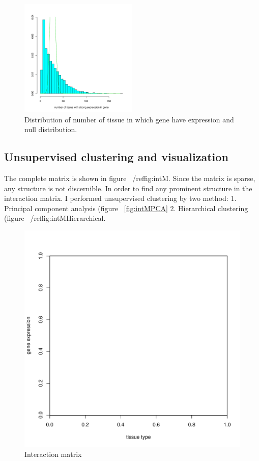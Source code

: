 \documentclass{article}
\begin{document}
\begin{figure}[ht]
	\begin{center}
		\includegraphics[width=0.5\textwidth]{weakExpressed.pdf}
	\end{center}
	\caption{ Distribution of number of tissue in which gene have expression and null distribution.}
	\label{fig:weakEx}
\end{figure}


\subsection{Unsupervised clustering and visualization}

The complete matrix is shown in 
figure ~/ref{fig:intM}. Since the matrix is sparse, any structure is not discernible. 
In order to find any prominent structure in the interaction matrix. I performed unsupervised clustering by two method: 1. Principal component
analysis (figure ~\ref{fig:intMPCA} 2. Hierarchical clustering (figure ~/ref{fig:intMHierarchical}.

\begin{figure}[ht]
	\begin{center}
		\includegraphics[scale=0.7]{interactionMatrix.pdf}
	\end{center}
	\caption{Interaction matrix}
	\label{fig:intM}
\end{figure}
\end{document}
